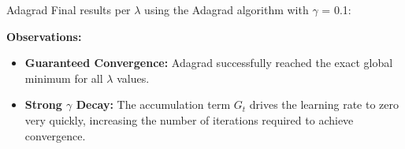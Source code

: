 \documentclass[10pt]{beamer}
\begin{document}
\begin{frame}{Adagrad}
    \small
    Final results per $\lambda$ using the Adagrad algorithm with $\gamma$ = 0.1:

    \vspace{0.4cm}
    \begin{table}[]
        \centering
    \end{table}

    \vspace{0.2cm}
    \textbf{Observations:}
    \begin{itemize}
        \item \textbf{Guaranteed Convergence:} Adagrad successfully reached the exact global minimum for all $\lambda$ values. 
        \item \textbf{Strong $\gamma$ Decay:} The accumulation term $G_t$ drives the learning rate to zero very quickly, increasing the number of iterations required to achieve convergence.
    \end{itemize}
\end{frame}
\end{document}
